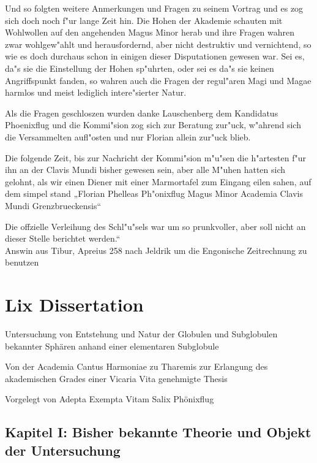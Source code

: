 \documentclass[a5paper,8pt]{book}
\begin{document}
Und so folgten weitere Anmerkungen und Fragen zu seinem Vortrag und es zog sich doch noch f"ur lange Zeit hin. Die Hohen der Akademie schauten mit Wohlwollen auf den angehenden Magus Minor herab und ihre Fragen wahren zwar wohlgew"ahlt und herausfordernd, aber nicht destruktiv und vernichtend, so wie es doch durchaus schon in einigen dieser Disputationen gewesen war. Sei es, da"s sie die Einstellung der Hohen sp"uhrten, oder sei es da"s sie keinen Angriffspunkt fanden, so wahren auch die Fragen der regul"aren Magi und Magae harmlos und meist lediglich intere"sierter Natur.

Als die Fragen geschloszen wurden danke Lauschenberg dem Kandidatus Phoenixflug und die Kommi"sion zog sich zur Beratung zur"uck, w"ahrend sich die Versammelten aufl"osten und nur Florian allein zur"uck blieb.

Die folgende Zeit, bis zur Nachricht der Kommi"sion m"u"sen die h"artesten f"ur ihn an der Clavis Mundi bisher gewesen sein, aber alle M"uhen hatten sich gelohnt, als wir einen Diener mit einer Marmortafel zum Eingang eilen sahen, auf dem simpel stand „Florian Phelleas Ph"onixflug Magus Minor Academia Clavis Mundi Grenzbrueckensis“

Die offzielle Verleihung des Schl"u"sels war um so prunkvoller, aber soll nicht an dieser Stelle berichtet werden.“\\

\vspace{10mm}
Answin aus Tibur, Apreius 258 nach Jeldrik um die Engonische Zeitrechnung zu benutzen



\newpage

\section{Lix Dissertation}



Untersuchung von Entstehung und Natur der Globulen und Subglobulen bekannter Sphären anhand einer elementaren Subglobule


Von der Academia Cantus Harmoniae zu Tharemis zur Erlangung des akademischen Grades einer Vicaria Vita genehmigte Thesis


Vorgelegt von Adepta Exempta Vitam Salix Phönixflug


\subsection{Kapitel I: Bisher bekannte Theorie und Objekt der Untersuchung}
\end{document}
